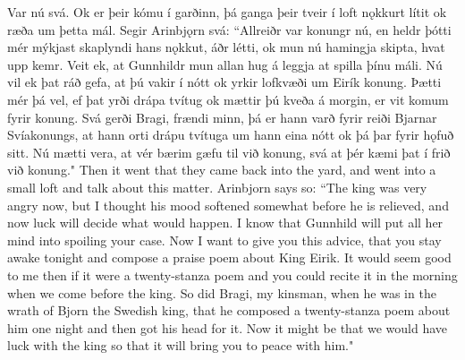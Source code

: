 \begin{paracol}{2}
  Var nú svá. Ok er þeir kómu í garðinn, þá ganga þeir tveir í loft nǫkkurt lítit ok ræða um þetta mál. Segir Arinbjǫrn svá: ``Allreiðr var konungr nú, en heldr þótti mér mýkjast skaplyndi hans nǫkkut, áðr létti, ok mun nú hamingja skipta, hvat upp kemr. Veit ek, at Gunnhildr mun allan hug á leggja at spilla þínu máli. Nú vil ek þat ráð gefa, at þú vakir í nótt ok yrkir lofkvæði um Eirík konung. Þætti mér þá vel, ef þat yrði drápa tvítug ok mættir þú kveða á morgin, er vit komum fyrir konung. Svá gerði Bragi, frændi minn, þá er hann varð fyrir reiði Bjarnar Svíakonungs, at hann orti drápu tvítuga um hann eina nótt ok þá þar fyrir hǫfuð sitt. Nú mætti vera, at vér bærim gæfu til við konung, svá at þér kæmi þat í frið við konung."
  \switchcolumn
  Then it went that they came back into the yard, and went into a small loft and talk about this matter. Arinbjorn says so: ``The king was very angry now, but I thought his mood softened somewhat before he is relieved, and now luck will decide what would happen. I know that Gunnhild will put all her mind into spoiling your case. Now I want to give you this advice, that you stay awake tonight and compose a praise poem about King Eirik. It would seem good to me then if it were a twenty-stanza poem and you could recite it in the morning when we come before the king. So did Bragi, my kinsman, when he was in the wrath of Bjorn the Swedish king, that he composed a twenty-stanza poem about him one night and then got his head for it. Now it might be that we would have luck with the king so that it will bring you to peace with him."
\end{paracol}

